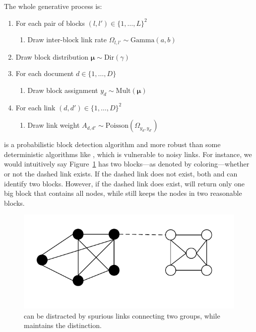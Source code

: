 The whole generative process is:\par\nobreak
\begin{small}
\begin{enumerate}[leftmargin=*,noitemsep]
\item For each pair of blocks $(l,l')\in \{1,\ldots,L\}^2$
    \begin{enumerate}
    \item Draw inter-block link rate $\Omega_{l,l'}\sim \mathrm{Gamma}(a,b)$
    \end{enumerate}
\item Draw block distribution $\bm{\mu}\sim \mathrm{Dir}(\gamma)$
\item For each document $d\in \{1,\ldots,D\}$
    \begin{enumerate}
    \item Draw block assignment $y_d\sim \mathrm{Mult}(\bm{\mu})$
    \end{enumerate}
\item For each link $(d,d') \in \{1,\ldots,D\}^2$
    \begin{enumerate}
    \item Draw link weight $A_{d,d'} \sim \mathrm{Poisson}(\Omega_{y_d,y_{d'}})$
    \end{enumerate}
\end{enumerate}
\end{small}

\wsbm is a probabilistic block detection algorithm and more robust than some
deterministic algorithms like \scc, which is vulnerable to noisy links.  For
instance, we would intuitively say Figure~\ref{fig:block} has two blocks---as
denoted by coloring---whether or not the dashed link exists.  If the dashed link
does not exist, both \wsbm and \scc can identify two blocks.  However, if the
dashed link does exist, \scc will return only one big block that contains all
nodes, while \wsbm still keeps the nodes in two reasonable blocks.

\begin{figure}[t!]
  \centering
  \includegraphics[width=.60\linewidth]{2016_acl_docblock/figures/block_example.pdf}
  \caption{\scc can be distracted by spurious links connecting two groups, while
    \wsbm maintains the distinction.}\label{fig:block}
\end{figure}

